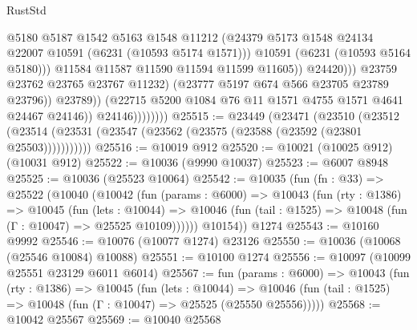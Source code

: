 \begin{lexlean}{RustStd}
\begin{coremodule}
{{                                          @5180
                                          @5187
                                          @1542
                                          @5163
                                          @1548
                                          @11212
                                          (@24379
                                            @5173
                                            @1548
                                            @24134
                                            @22007
                                            @10591
                                            (@6231 (@10593 @5174 @1571)))
                                          @10591
                                          (@6231 (@10593 @5164 @5180)))
                                        @11584
                                        @11587
                                        @11590
                                        @11594
                                        @11599
                                        @11605))
                                    @24420)))
                              @23759
                              @23762
                              @23765
                              @23767
                              @11232)
                            (@23777 @5197 @674 @566 @23705 @23789 @23796))
                          @23789))
                      (@22715 @5200 @1084 @76 @11 @1571 @4755 @1571 @4641 @24467 @24146))
                    @24146))))))))
@25515 := @23449
    (@23471
      (@23510
        (@23512 (@23514 (@23531 (@23547 (@23562 (@23575 (@23588 (@23592 (@23801 @25503)))))))))))
@25516 := @10019 @912
@25520 := @10021 (@10025 @912) (@10031 @912)
@25522 := @10036 (@9990 @10037)
@25523 := @6007 @8948
@25525 := @10036 (@25523 @10064)
@25542 := @10035
    (fun (fn : @33) =>
    @25522
      (@10040
        (@10042
          (fun (params : @6000) =>
          @10043
            (fun (rty : @1386) =>
            @10045
              (fun (lets : @10044) =>
              @10046 (fun (tail : @1525) => @10048 (fun (Γ : @10047) => @25525 @10109))))))
        @10154))
    @1274
@25543 := @10160 @9992
@25546 := @10076 (@10077 @1274) @23126
@25550 := @10036 (@10068 (@25546 @10084) @10088)
@25551 := @10100 @1274
@25556 := @10097 (@10099 @25551 @23129 @6011 @6014)
@25567 := fun (params : @6000) =>
  @10043
    (fun (rty : @1386) =>
    @10045
      (fun (lets : @10044) =>
      @10046 (fun (tail : @1525) => @10048 (fun (Γ : @10047) => @25525 (@25550 @25556)))))
@25568 := @10042 @25567
@25569 := @10040 @25568
}}
\end{coremodule}
\end{lexlean}
